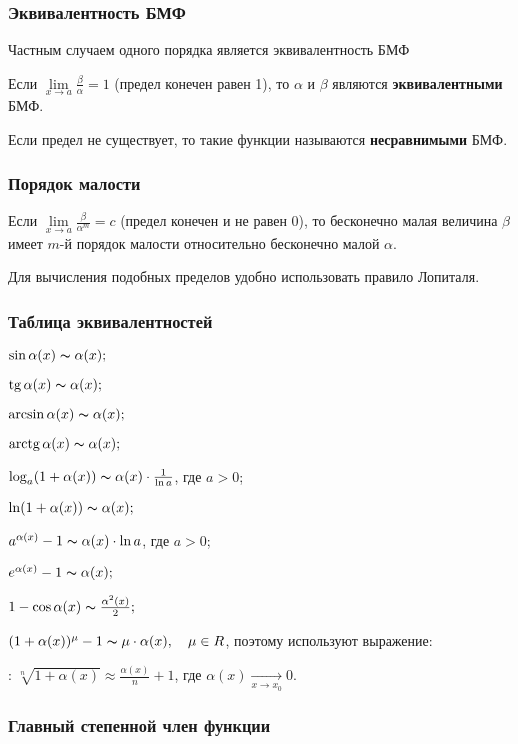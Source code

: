 \subsubsection{Эквивалентность БМФ}

Частным случаем одного порядка является эквивалентность БМФ

Если $\lim\limits_{x\to a}\frac{\beta}{\alpha} = 1$ (предел конечен равен 1), то $\alpha$ и $\beta$ являются \textbf{эквивалентными} БМФ.

Если предел не существует, то такие функции называются \textbf{несравнимыми} БМФ.

\subsubsection{Порядок малости}

Если $\lim\limits_{x\to a}\frac{\beta}{\alpha^m}=c$ (предел конечен и не равен 0), то бесконечно малая величина $\beta$ имеет $m$-й порядок малости относительно бесконечно малой $\alpha$.

Для вычисления подобных пределов удобно использовать правило Лопиталя.

\subsubsection{Таблица эквивалентностей}

$\sin\alpha(x)\thicksim\alpha(x);$

$\mathrm{tg}\,\alpha(x)\thicksim\alpha(x);$

$\arcsin{\alpha(x)}\thicksim\alpha(x);$

$\mathrm{arctg}\,\alpha(x)\thicksim\alpha(x);$

$\log_a(1+\alpha(x))\thicksim\alpha(x)\cdot\frac{1}{\ln{a}}$, где $a>0$;

$\ln(1+\alpha (x))\thicksim\alpha(x);$

$a^{\alpha(x)}-1\thicksim\alpha(x)\cdot\ln{a}$, где $a>0$;

$e^{\alpha(x)}-1\thicksim\alpha(x);$

$1-\cos{\alpha(x)}\thicksim\frac{\alpha^2(x)}{2};$

$(1+\alpha(x))^\mu-1\thicksim\mu\cdot\alpha(x),\quad\mu\in R$, поэтому используют выражение:

: $\sqrt[n]{1+\alpha(x)}\approx\frac{\alpha(x)}{n}+1$, где $\alpha(x)\xrightarrow[x\to x_0]{}0$.

\subsubsection{Главный степенной член функции}

